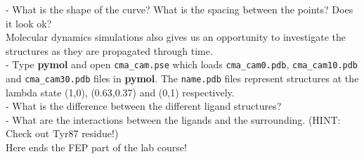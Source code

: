 \documentclass[10pt,oneside,pdftex]{article}
\begin{document}
- What is the shape of the curve? What is the spacing between the
points? Does it look ok?\\

Molecular dynamics simulations also gives us an opportunity to
investigate the structures as they are propagated through time. \\

- Type \textbf{pymol} and open \texttt{cma\_cam.pse} which loads
\texttt{cma\_cam0.pdb}, \texttt{cma\_cam10.pdb} and
\texttt{cma\_cam30.pdb} files in \textbf{pymol}. The
\texttt{name.pdb} files represent structures at the lambda state
(1,0), (0.63,0.37) and (0,1) respectively. \\

- What is the difference between the different ligand structures?\\

- What are the interactions between the ligands and the
surrounding. (HINT: Check out Tyr87 residue!)\\

Here ends the FEP part of the lab course!


\newpage
\appendix
\end{document}
